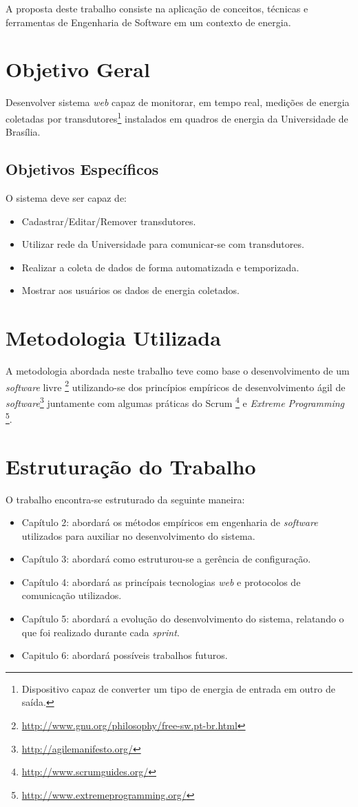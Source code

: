 A proposta deste trabalho consiste na aplicação de conceitos, técnicas e ferramentas de Engenharia de Software em um contexto de energia.

\section{Objetivo Geral}
Desenvolver sistema \textit{web} capaz de monitorar, em tempo real, medições de energia coletadas por transdutores\footnote{Dispositivo capaz de converter um tipo de energia de entrada em outro de saída.}
instalados em quadros de energia da Universidade de Brasília.

\subsection{Objetivos Específicos}
O sistema deve ser capaz de:
\begin{itemize}
    \item Cadastrar/Editar/Remover transdutores.
    \item Utilizar rede da Universidade para comunicar-se com transdutores.
    \item Realizar a coleta de dados de forma automatizada e temporizada.
    \item Mostrar aos usuários os dados de energia coletados.
\end{itemize}

\section{Metodologia Utilizada}
A metodologia abordada neste trabalho teve como base o desenvolvimento de um \textit{software} livre \footnote{\url{http://www.gnu.org/philosophy/free-sw.pt-br.html}} utilizando-se dos princípios empíricos de desenvolvimento ágil de \textit{software}\footnote{\url{http://agilemanifesto.org/}} juntamente com algumas práticas do Scrum \footnote{\url{http://www.scrumguides.org/}} e \textit{Extreme Programming} \footnote{\url{http://www.extremeprogramming.org/}}.

\section{Estruturação do Trabalho}
O trabalho encontra-se estruturado da seguinte maneira:

\begin{itemize}
    \item Capítulo 2: abordará os métodos empíricos em engenharia de \textit{software} utilizados para
    auxiliar no desenvolvimento do sistema.
    \item Capítulo 3: abordará como estruturou-se a gerência de configuração.
    \item Capítulo 4: abordará as princípais tecnologias \textit{web} e protocolos de comunicação utilizados.
    \item Capítulo 5: abordará a evolução do desenvolvimento do sistema, relatando o que foi realizado durante cada \textit{sprint}.
    \item Capitulo 6: abordará possíveis trabalhos futuros.
\end{itemize}